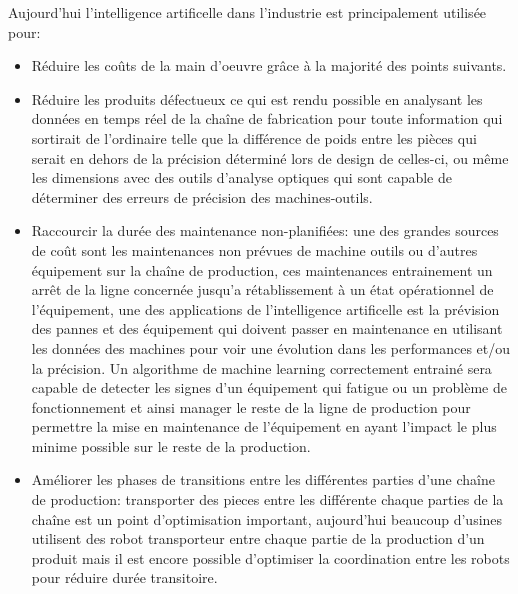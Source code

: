         Aujourd'hui l'intelligence artificelle dans l'industrie est principalement utilisée pour:
        \begin{itemize}
            \item Réduire les coûts de la main d'oeuvre grâce à la majorité des points suivants. \newline

            \item Réduire les produits défectueux ce qui est rendu possible en analysant les données
            en temps réel de la chaîne de fabrication pour toute information qui sortirait de l'ordinaire 
            telle que la différence de poids entre les pièces qui serait en dehors de la précision déterminé
            lors de design de celles-ci, ou même les dimensions avec des outils d'analyse optiques qui 
            sont capable de déterminer des erreurs de précision des machines-outils. \newline

            \item Raccourcir la durée des maintenance non-planifiées: une des grandes sources de coût sont les 
            maintenances non prévues de machine outils ou d'autres équipement sur la chaîne de production, ces
            maintenances entrainement un arrêt de la ligne concernée jusqu'a rétablissement à un état 
            opérationnel de l'équipement, une des applications de l'intelligence artificelle est la 
            prévision des pannes et des équipement qui doivent passer en maintenance en utilisant les données
            des machines pour voir une évolution dans les performances et/ou la précision.
            Un algorithme de machine learning correctement entrainé sera capable de detecter les signes 
            d'un équipement qui fatigue ou un problème de fonctionnement et ainsi manager le reste 
            de la ligne de production pour permettre la mise en maintenance de l'équipement en ayant 
            l'impact le plus minime possible sur le reste de la production. \newline 

            \item Améliorer les phases de transitions entre les différentes parties d'une 
            chaîne de production: transporter des pieces entre les différente chaque parties 
            de la chaîne est un point d'optimisation important, aujourd'hui beaucoup d'usines
            utilisent des robot transporteur entre chaque partie de la production d'un produit
            mais il est encore possible d'optimiser la coordination entre les robots pour réduire
            durée transitoire. \newline 


\end{itemize}
